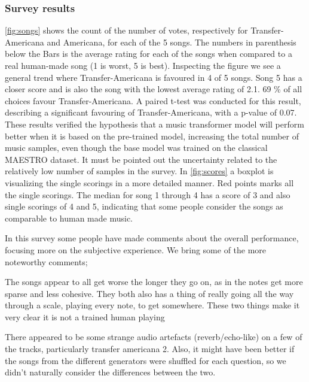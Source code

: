 \documentclass{IEEEtran}
\begin{document}
\subsubsection{Survey results}

\autoref{fig:songs} shows the count of the number of votes, respectively
for Transfer-Americana and Americana, for each of the 5 songs. The numbers in
parenthesis below the Bars is the average rating for each of the songs when
compared to a real human-made song (1 is worst, 5 is best). Inspecting the
figure we see a general trend where Transfer-Americana is favoured in 4 of 5
songs. Song 5 has a closer score and is also the song with the lowest average
rating of 2.1. 69 \% of all choices favour Transfer-Americana. A paired
t-test was conducted for this result, describing a significant favouring of
Transfer-Americana, with a p-value of 0.07. These results verified the
hypothesis that a music transformer model will perform better when it is
based on the pre-trained model, increasing the total number of music samples,
even though the base model was trained on the classical MAESTRO
dataset. It must be pointed out the uncertainty related to the relatively low
number of samples in the survey. In \autoref{fig:scores} a boxplot is
visualizing the single scorings in a more detailed manner. Red points marks
all the single scorings. The median for song 1 through 4 has a score of 3 and also
single scorings of 4 and 5, indicating that some people consider the songs as
comparable to human made music.

In this survey some people have made comments about the overall performance,
focusing more on the subjective experience. We bring some of the more
noteworthy comments;

\begin{displayquote}
The songs appear to all
get worse the longer they go on, as in the notes get more sparse and less
cohesive. They both also has a thing of really going all the way through a
scale, playing every note, to get somewhere. These two things make it very
clear it is not a trained human playing
\end{displayquote}

\begin{displayquote}
There appeared to be
some strange audio artefacts (reverb/echo-like) on a few of the tracks,
particularly transfer americana 2. Also, it might have been better if the
songs from the different generators were shuffled for each question, so we
didn't naturally consider the differences between the two.
\end{displayquote}
\end{document}

